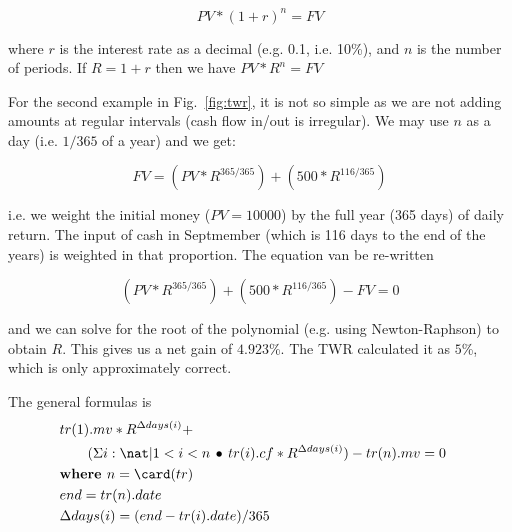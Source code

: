 \documentclass[runningheads,12pt]{article}
\begin{document}
\[ PV * (1+r)^n = FV\]

\noindent where $r$ is the interest rate as a decimal (e.g. 0.1, i.e. 10\%), and $n$ is the number of periods. If $R=1+r$ then we have $PV * R^n = FV$


For the second example in Fig.~\ref{fig:twr}, it is not so simple as we are not adding amounts at regular intervals (cash flow in/out is irregular). We may use $n$ as a day (i.e. $1/365$ of a year) and we get:

\[
FV = (PV *R^{365/365}) + (500*R^{116/365})
\]

i.e. we weight the initial money ($PV = 10000$) by the full year (365 days) of daily return. The input of cash in Septmember (which is 116 days to the end of the years) is weighted in that proportion. The equation van be re-written

\[
(PV *R^{365/365}) + (500*R^{116/365}) -FV = 0
\]

and we can solve for the root of the polynomial (e.g. using Newton-Raphson) to obtain $R$. This gives us a net gain of $4.923$\%. The TWR calculated it as $5$\%, which is only approximately correct.

The general formulas is
\begin{align}
\small
& tr(1).mv * R^{\Delta days(i)} + \\\nonumber
& \qquad (\Sigma i: \nat|1 < i < n\itholds tr(i).cf * R^{\Delta days(i)})- tr(n).mv = 0\\
& \textbf{where } n = \card(tr)& \nonumber \\
& end = tr(n).date&\\\nonumber
&\Delta days(i) = (end- tr(i).date)/365&\nonumber
\end{align}
\end{document}
